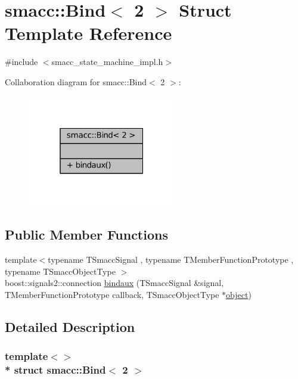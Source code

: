 \hypertarget{structsmacc_1_1Bind_3_012_01_4}{}\section{smacc\+:\+:Bind$<$ 2 $>$ Struct Template Reference}
\label{structsmacc_1_1Bind_3_012_01_4}


{\ttfamily \#include $<$smacc\+\_\+state\+\_\+machine\+\_\+impl.\+h$>$}



Collaboration diagram for smacc\+:\+:Bind$<$ 2 $>$\+:
\nopagebreak
\begin{figure}[H]
\begin{center}
\leavevmode
\includegraphics[width=184pt]{structsmacc_1_1Bind_3_012_01_4__coll__graph}
\end{center}
\end{figure}
\subsection*{Public Member Functions}
\begin{DoxyCompactItemize}
\item 
{\footnotesize template$<$typename T\+Smacc\+Signal , typename T\+Member\+Function\+Prototype , typename T\+Smacc\+Object\+Type $>$ }\\boost\+::signals2\+::connection \hyperlink{structsmacc_1_1Bind_3_012_01_4_ad974781e83d154953d6a4ae0f3632a8f}{bindaux} (T\+Smacc\+Signal \&signal, T\+Member\+Function\+Prototype callback, T\+Smacc\+Object\+Type $\ast$\hyperlink{classobject}{object})
\end{DoxyCompactItemize}


\subsection{Detailed Description}
\subsubsection*{template$<$$>$\\*
struct smacc\+::\+Bind$<$ 2 $>$}



